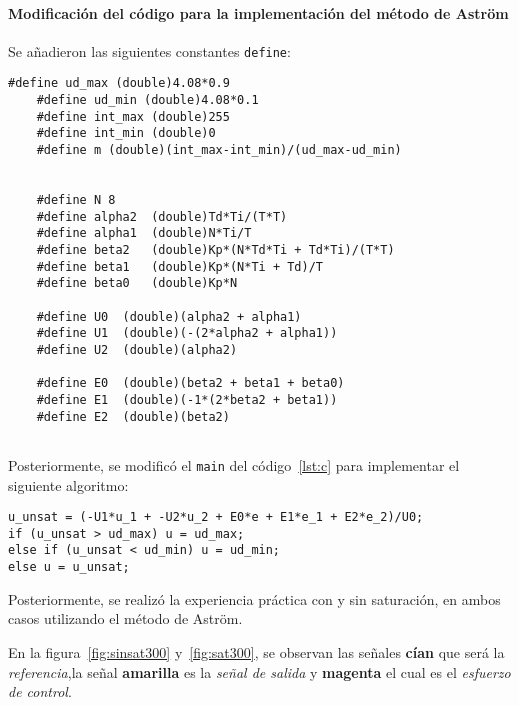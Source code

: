 \onecolumn
\paragraph{Modificación del código para la implementación del método de Astr\"om}
Se añadieron las siguientes constantes \texttt{define}: \hfill \break

\begin{lstlisting}[style=cstyle,caption={Definiciones adicionales para implementar Astr\"om},label={lst:c1}]
	#define ud_max (double)4.08*0.9
	#define ud_min (double)4.08*0.1
	#define int_max (double)255
	#define int_min (double)0
	#define m (double)(int_max-int_min)/(ud_max-ud_min)
	
	
	#define N 8
	#define alpha2  (double)Td*Ti/(T*T)
	#define alpha1  (double)N*Ti/T
	#define beta2   (double)Kp*(N*Td*Ti + Td*Ti)/(T*T)
	#define beta1   (double)Kp*(N*Ti + Td)/T
	#define beta0   (double)Kp*N
	
	#define U0  (double)(alpha2 + alpha1)
	#define U1  (double)(-(2*alpha2 + alpha1))
	#define U2  (double)(alpha2)
	
	#define E0  (double)(beta2 + beta1 + beta0)
	#define E1  (double)(-1*(2*beta2 + beta1))
	#define E2  (double)(beta2)
	
\end{lstlisting}

Posteriormente, se modificó el \texttt{main} del código~\ref{lst:c} para implementar el siguiente algoritmo:

\begin{lstlisting}[style=cstyle,caption={Implementación del algoritmo de Aström con saturación},label={lst:c1}]
u_unsat = (-U1*u_1 + -U2*u_2 + E0*e + E1*e_1 + E2*e_2)/U0;
if (u_unsat > ud_max) u = ud_max;
else if (u_unsat < ud_min) u = ud_min;
else u = u_unsat;

\end{lstlisting}

\twocolumn

Posteriormente, se realizó la experiencia práctica con y sin saturación, en ambos casos utilizando el método de Astr\"om.

En la figura~\ref{fig:sinsat300} y~\ref{fig:sat300}, se observan las señales \textbf{cían} que será la \textit{referencia},la señal \textbf{amarilla} es la \textit{señal de salida} y \textbf{magenta} el cual es el \textit{esfuerzo de control}. \hfill \break





